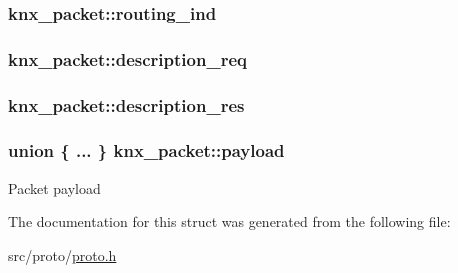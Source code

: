 \subsubsection[{\texorpdfstring{routing\+\_\+ind}{routing_ind}}]{ knx\+\_\+packet\+::routing\+\_\+ind}\hypertarget{structknx__packet_a36d90ba08b5345368cf825593858f2ff}{}\label{structknx__packet_a36d90ba08b5345368cf825593858f2ff}
\subsubsection[{\texorpdfstring{description\+\_\+req}{description_req}}]{ knx\+\_\+packet\+::description\+\_\+req}\hypertarget{structknx__packet_a0c3b07a198f28c1920fa6a9733031c5c}{}\label{structknx__packet_a0c3b07a198f28c1920fa6a9733031c5c}
\subsubsection[{\texorpdfstring{description\+\_\+res}{description_res}}]{ knx\+\_\+packet\+::description\+\_\+res}\hypertarget{structknx__packet_aec96c1383c69c27bc305d80fcb9b8d5e}{}\label{structknx__packet_aec96c1383c69c27bc305d80fcb9b8d5e}
\subsubsection[{\texorpdfstring{payload}{payload}}]{\setlength{\rightskip}{0pt plus 5cm}union \{ ... \}   knx\+\_\+packet\+::payload}\hypertarget{structknx__packet_af2e942a6804bb6e75272fdd43881a775}{}\label{structknx__packet_af2e942a6804bb6e75272fdd43881a775}
Packet payload 

The documentation for this struct was generated from the following file\+:\begin{DoxyCompactItemize}
\item 
src/proto/\hyperlink{proto_8h}{proto.\+h}\end{DoxyCompactItemize}
